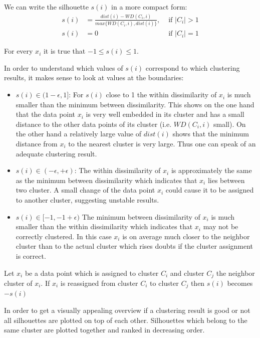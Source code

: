 \begin{remark}
	We can write the silhouette $s(i)$ in a more compact form: 
	\begin{align*}
		s(i) &= \frac{dist(i) - WD(C_i,i)}{max\{ WD(C_i,i), dist(i) \}},  &\text{ if } |C_i|>1 \\
		s(i) &= 0  &\text{ if } |C_i|=1
	\end{align*}
\end{remark}

\begin{remark}
	For every $x_i$ it is true that $-1 \leq s(i) \leq 1$.
\end{remark}

\begin{remark}
	In order to understand which values of $s(i)$ correspond to which clustering results, it makes sense to look at values at the boundaries: 
	\begin{itemize}%
		\item $s(i) \in (1 - \epsilon, 1]$: For $s(i)$ close to 1 the within dissimilarity of $x_i$ is much smaller than the minimum between dissimilarity. This shows on the one hand that the data point $x_i$ is very well embedded in its cluster and has a small distance to the other data points of its cluster (i.e. $WD(C_i,i)$ small). On the other hand a relatively large value of $dist(i)$ shows that the minimum distance from $x_i$ to the nearest cluster is very large. Thus one can speak of an adequate clustering result.		
		\item $s(i) \in (-\epsilon, + \epsilon)$: The within dissimilarity of $x_i$ is approximately the same as the minimum between dissimilarity which indicates that $x_i$ lies between two cluster. A small change of the data point $x_i$ could cause it to be assigned to another cluster, suggesting unstable results.		
		\item $s(i) \in [-1, -1 + \epsilon)$ The minimum between dissimilarity of $x_i$ is much smaller than the within dissimilarity which indicates that $x_i$ may not be correctly clustered. In this case $x_i$ is on average much closer to the neighbor cluster than to the actual cluster which rises doubts if the cluster assignment is correct. 
	\end{itemize}
\end{remark}

\begin{remark}	
	Let $x_i$ be a data point which is assigned to cluster $C_i$ and cluster $C_j$ the neighbor cluster of $x_i$. If $x_i$ is reassigned from cluster $C_i$ to cluster $C_j$ then $s (i)$ becomes $-s(i)$
\end{remark}
In order to get a visually appealing overview if a clustering result is good or not all silhouettes are plotted on top of each other. Silhouettes which belong to the same cluster are plotted together and ranked in decreasing order.

